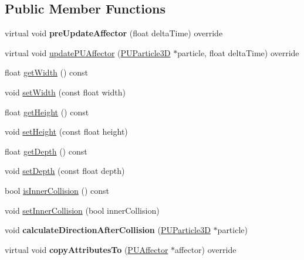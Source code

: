 \subsection*{Public Member Functions}
\begin{DoxyCompactItemize}
\item 
\mbox{\label{classPUBoxCollider_aba5c39c29c65fb92b0745e783dca8ca1}} 
virtual void {\bfseries pre\+Update\+Affector} (float delta\+Time) override
\item 
virtual void \hyperlink{classPUBoxCollider_ae4719224dfc6368f18e40654b5411363}{update\+P\+U\+Affector} (\hyperlink{structPUParticle3D}{P\+U\+Particle3D} $\ast$particle, float delta\+Time) override
\item 
float \hyperlink{classPUBoxCollider_a6c2260632b3923ecc0eee1125b328ba4}{get\+Width} () const
\item 
void \hyperlink{classPUBoxCollider_aad771def3e9af572efaa8133fb2ab070}{set\+Width} (const float width)
\item 
float \hyperlink{classPUBoxCollider_a6377a68d34e05968b6c4eb3d085deaba}{get\+Height} () const
\item 
void \hyperlink{classPUBoxCollider_a810bf05c351a0cdf948b59e3650065c4}{set\+Height} (const float height)
\item 
float \hyperlink{classPUBoxCollider_a46d59e89fdeeccd6444135b0adda5f3c}{get\+Depth} () const
\item 
void \hyperlink{classPUBoxCollider_a932ec7d1d4a2bd823c2ce126ebb1dffe}{set\+Depth} (const float depth)
\item 
bool \hyperlink{classPUBoxCollider_ad6f759d90931e9221184688d362e5413}{is\+Inner\+Collision} () const
\item 
void \hyperlink{classPUBoxCollider_aa33fc7d0f8f816c3aed9e44355387026}{set\+Inner\+Collision} (bool inner\+Collision)
\item 
\mbox{\label{classPUBoxCollider_a861b41d3efc2a17a56387eae34ec6823}} 
void {\bfseries calculate\+Direction\+After\+Collision} (\hyperlink{structPUParticle3D}{P\+U\+Particle3D} $\ast$particle)
\item 
\mbox{\label{classPUBoxCollider_a09ce8e615c6a378dbd3ec13322cba9c4}} 
virtual void {\bfseries copy\+Attributes\+To} (\hyperlink{classPUAffector}{P\+U\+Affector} $\ast$affector) override
\item 
\mbox{\label{classPUBoxCollider_ae6747dbfc7be5be02774f9417364bac4}} 

\end{DoxyCompactItemize}

